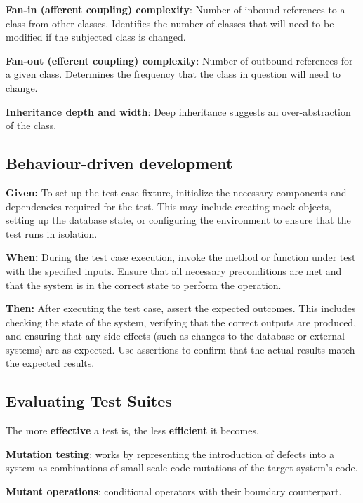 \documentclass{article}
\begin{document}
\noindent \textbf{Fan-in (afferent coupling) complexity}: Number of inbound references to a class from other classes. Identifies the number of classes that will need to be modified if the subjected class is changed.

\noindent \textbf{Fan-out (efferent coupling) complexity}: Number of outbound references for a given class. Determines the frequency that the class in question will need to change.

\noindent \textbf{Inheritance depth and width}: Deep inheritance suggests an over-abstraction of the class.


\subsection*{Behaviour-driven development}

\noindent \textbf{Given:} To set up the test case fixture, initialize the necessary components and dependencies required for the test. This may include creating mock objects, setting up the database state, or configuring the environment to ensure that the test runs in isolation.

\noindent \textbf{When:} During the test case execution, invoke the method or function under test with the specified inputs. Ensure that all necessary preconditions are met and that the system is in the correct state to perform the operation.

\noindent \textbf{Then:} After executing the test case, assert the expected outcomes. This includes checking the state of the system, verifying that the correct outputs are produced, and ensuring that any side effects (such as changes to the database or external systems) are as expected. Use assertions to confirm that the actual results match the expected results.


\subsection*{Evaluating Test Suites}

\noindent The more \textbf{effective} a test is, the less \textbf{efficient} it becomes.

\noindent \textbf{Mutation testing}: works by representing the introduction of defects into a system as combinations of small-scale code mutations of the target system's code.

\noindent \textbf{Mutant operations}:  conditional operators with their boundary counterpart.
\end{document}
